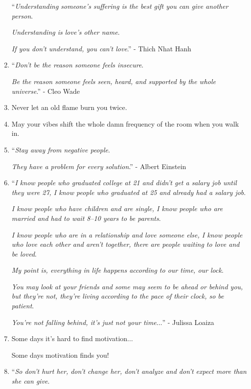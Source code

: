\documentclass{article}
\begin{document}
\begin{enumerate}
	``\textit{Understanding someone's suffering is the best gift you can give another person}.
	
	\textit{Understanding is love's other name}.
	
	\textit{If you don't understand, you can't love}.'' - Thich Nhat Hanh
	\item ``\textit{Don't be the reason someone feels insecure}.
	
	\textit{Be the reason someone feels seen, heard, and supported by the whole universe}.'' - Cleo Wade
	\item Never let an old flame burn you twice.
	\item May your vibes shift the whole damn frequency of the room when you walk in.
	\item ``\textit{Stay away from negative people}.
	
	\textit{They have a problem for every solution}.'' - Albert Einstein
	\item ``\textit{I know people who graduated college at 21 and didn't get a salary job until they were 27, I know people who graduated at 25 and already had a salary job}.
	
	\textit{I know people who have children and are single, I know people who are married and had to wait 8--10 years to be parents}.
	
	\textit{I know people who are in a relationship and love someone else, I know people who love each other and aren't together, there are people waiting to love and be loved}.
	
	\textit{My point is, everything in life happens according to our time, our lock}.
	
	\textit{You may look at your friends and some may seem to be ahead or behind you, but they're not, they're living according to the pace of their clock, so be patient}.
	
	\textit{You're not falling behind, it's just not your time}$\ldots$'' - Julissa Loaiza
	\item Some days it's hard to find motivation$\ldots$
	
	Some days motivation finds you!
	\item ``\textit{So don't hurt her, don't change her, don't analyze and don't expect more than she can give}.
	

\end{enumerate}
\end{document}
